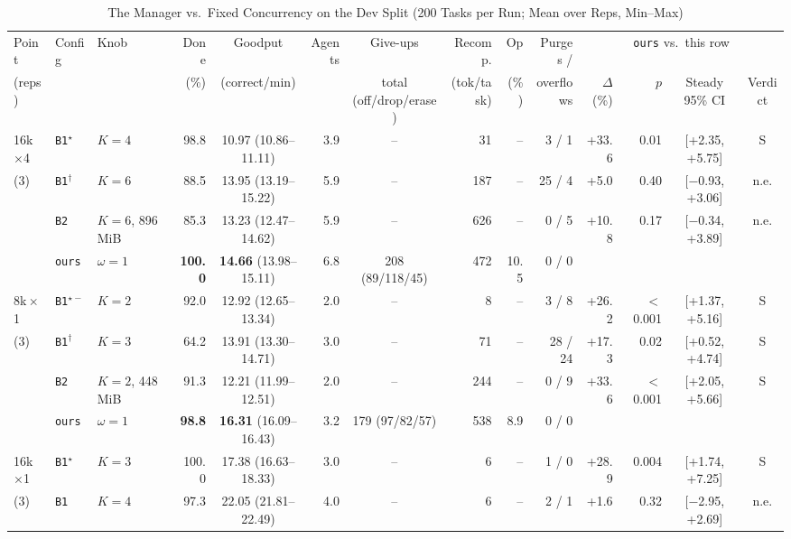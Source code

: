 \documentclass[conference]{IEEEtran}
\newcommand{\x}{$\times$}
\newcommand{\pick}{$^\star$}
\newcommand{\pickf}{$^{\star-}$}
\newcommand{\topk}{$^\dagger$}
\newcommand{\cfg}[1]{\texttt{#1}}
\begin{document}
\begin{table}[!t]
  \caption{The Manager vs.\ Fixed Concurrency on the Dev Split (200 Tasks per Run; Mean over Reps, Min--Max)}
  \label{tab:main}
  \centering
  \scriptsize
  \setlength{\tabcolsep}{2.7pt}
  \renewcommand{\arraystretch}{0.9}
  \begin{tabular}{@{}lllrcrcrrrrrcc@{}}
    \toprule
    Point & Config & Knob & Done & Goodput & Agents & Give-ups & Recomp. & Op & Purges / &
      \multicolumn{4}{c}{\cfg{ours} vs.\ this row} \\
    \cmidrule(l){11-14}
     (reps) & & & (\%) & (correct/min) & & total (off/drop/erase) & (tok/task) & (\%) & overflows
      & $\Delta$ (\%) & $p$ & Steady 95\% CI & Verdict \\
    \midrule
    16k\,\x4 & \cfg{B1}\pick & $K{=}4$ & 98.8 & 10.97 (10.86--11.11) & 3.9 & -- & 31 & -- & 3 / 1 &
      +33.6 & 0.01 & [+2.35, +5.75] & S \\
    (3) & \cfg{B1}\topk & $K{=}6$ & 88.5 & 13.95 (13.19--15.22) & 5.9 & -- & 187 & -- & 25 / 4 &
      +5.0 & 0.40 & [$-$0.93, +3.06] & n.e. \\
     & \cfg{B2} & $K{=}6$, 896\,MiB & 85.3 & 13.23 (12.47--14.62) & 5.9 & -- & 626 & -- & 0 / 5 &
      +10.8 & 0.17 & [$-$0.34, +3.89] & n.e. \\
     & \cfg{ours} & $\omega{=}1$ & \textbf{100.0} & \textbf{14.66} (13.98--15.11) & 6.8 &
      208 (89/118/45) & 472 & 10.5 & 0 / 0 & & & & \\
    \midrule
    8k\,\x1 & \cfg{B1}\pickf & $K{=}2$ & 92.0 & 12.92 (12.65--13.34) & 2.0 & -- & 8 & -- & 3 / 8 &
      +26.2 & $<$0.001 & [+1.37, +5.16] & S \\
    (3) & \cfg{B1}\topk & $K{=}3$ & 64.2 & 13.91 (13.30--14.71) & 3.0 & -- & 71 & -- & 28 / 24 &
      +17.3 & 0.02 & [+0.52, +4.74] & S \\
     & \cfg{B2} & $K{=}2$, 448\,MiB & 91.3 & 12.21 (11.99--12.51) & 2.0 & -- & 244 & -- & 0 / 9 &
      +33.6 & $<$0.001 & [+2.05, +5.66] & S \\
     & \cfg{ours} & $\omega{=}1$ & \textbf{98.8} & \textbf{16.31} (16.09--16.43) & 3.2 & 179 (97/82/57) &
      538 & 8.9 & 0 / 0 & & & & \\
    \midrule
    16k\,\x1 & \cfg{B1}\pick & $K{=}3$ & 100.0 & 17.38 (16.63--18.33) & 3.0 & -- & 6 & -- & 1 / 0 &
      +28.9 & 0.004 & [+1.74, +7.25] & S \\
    (3) & \cfg{B1} & $K{=}4$ & 97.3 & 22.05 (21.81--22.49) & 4.0 & -- & 6 & -- & 2 / 1 &
      +1.6 & 0.32 & [$-$2.95, +2.69] & n.e. \\

\end{tabular}
\end{table}
\end{document}
